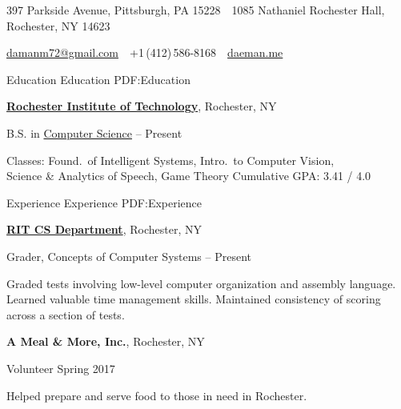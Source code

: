 \documentclass[letterpaper,MMMyyyy,nonstopmode]{simpleresumecv}
\newcommand{\CVAuthor}{Daman Morris}
\newcommand{\CVWebpage}{daeman.me}
\begin{document}

\Title{\CVAuthor}

\begin{SubTitle}
397 Parkside Avenue, Pittsburgh, PA 15228
\,\SubBulletSymbol\,
1085 Nathaniel Rochester Hall, Rochester, NY 14623
\par
\href{mailto:damanm72@gmail.com}
{damanm72@gmail.com}
\,\SubBulletSymbol\,
+1\,(412)\,586-8168
\,\SubBulletSymbol\,
\href{\CVWebpage}
{\url{\CVWebpage}}
\end{SubTitle}

\begin{Body}


\Section
{Education}
{Education}
{PDF:Education}

\Entry
\href{http://www.rit.edu}
{\textbf{Rochester Institute of Technology}},
Rochester, NY

\Gap
\BulletItem
B.S. in
\href{http://cs.rit.edu}
{Computer Science}
\hfill
{} --
Present
\begin{Detail}
\SubBulletItem
Classes:
Found.\ of Intelligent Systems, Intro.\ to Computer Vision, \\
Science \& Analytics of Speech, Game Theory
\SubBulletItem
Cumulative GPA: 3.41 / 4.0
\end{Detail}


\Section
{Experience}
{Experience}
{PDF:Experience}

\Entry
\href{http://cs.rit.edu}
{\textbf{RIT CS Department}},
Rochester, NY

\Gap
\BulletItem
Grader,
Concepts of Computer Systems
\hfill
{} --
Present
\begin{Detail}
\SubBulletItem
Graded tests involving low-level computer organization and assembly language.
\SubBulletItem
Learned valuable time management skills.
\SubBulletItem
Maintained consistency of scoring across a section of tests.
\end{Detail}

\BigGap
\Entry
\textbf{A Meal \& More, Inc.},
Rochester, NY

\Gap
\BulletItem
Volunteer
\hfill
Spring 2017
\begin{Detail}
    \SubBulletItem
    Helped prepare and serve food to those in need in Rochester.
\end{Detail}


\end{Body}
\end{document}
